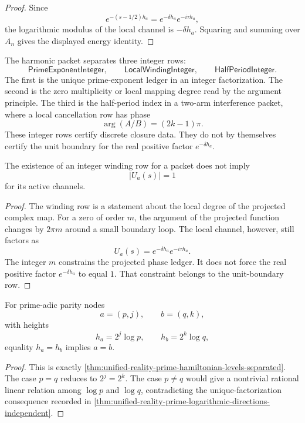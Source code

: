 \begin{proof}
Since
$$
e^{-(s-1/2)h_a}
=
e^{-\delta h_a}e^{-i\tau h_a},
$$
the logarithmic modulus of the local channel is $-\delta h_a$.  Squaring
and summing over $A_n$ gives the displayed energy identity.
\end{proof}

\begin{definition}
\label{def:unified-reality-harmonic-three-integer-rows}
The harmonic packet separates three integer rows:
$$
\mathsf{PrimeExponentInteger},
\qquad
\mathsf{LocalWindingInteger},
\qquad
\mathsf{HalfPeriodInteger}.
$$
The first is the unique prime-exponent ledger in an integer factorization.
The second is the zero multiplicity or local mapping degree read by the
argument principle.  The third is the half-period index in a two-arm
interference packet, where a local cancellation row has phase
$$
\arg(A/B)=(2k-1)\pi.
$$
These integer rows certify discrete closure data.  They do not by
themselves certify the unit boundary for the real positive factor
$e^{-\delta h_a}$.
\end{definition}

\begin{lemma}
\label{lem:unified-reality-integer-winding-does-not-remove-real-scale}
The existence of an integer winding row for a packet does not imply
$$
|U_a(s)|=1
$$
for its active channels.
\end{lemma}

\begin{proof}
The winding row is a statement about the local degree of the projected
complex map.  For a zero of order $m$, the argument of the projected
function changes by $2\pi m$ around a small boundary loop.  The local
channel, however, still factors as
$$
U_a(s)=e^{-\delta h_a}e^{-i\tau h_a}.
$$
The integer $m$ constrains the projected phase ledger.  It does not
force the real positive factor $e^{-\delta h_a}$ to equal $1$.  That
constraint belongs to the unit-boundary row.
\end{proof}

\begin{theorem}
\label{thm:unified-reality-prime-harmonic-levels-ledger-separated}
For prime-adic parity nodes
$$
a=(p,j),
\qquad
b=(q,k),
$$
with heights
$$
h_a=2^j\log p,
\qquad
h_b=2^k\log q,
$$
equality $h_a=h_b$ implies $a=b$.
\end{theorem}

\begin{proof}
This is exactly
\autoref{thm:unified-reality-prime-hamiltonian-levels-separated}.  The
case $p=q$ reduces to $2^j=2^k$.  The case $p\ne q$ would give a
nontrivial rational linear relation among $\log p$ and $\log q$,
contradicting the unique-factorization consequence recorded in
\autoref{thm:unified-reality-prime-logarithmic-directions-independent}.
\end{proof}

